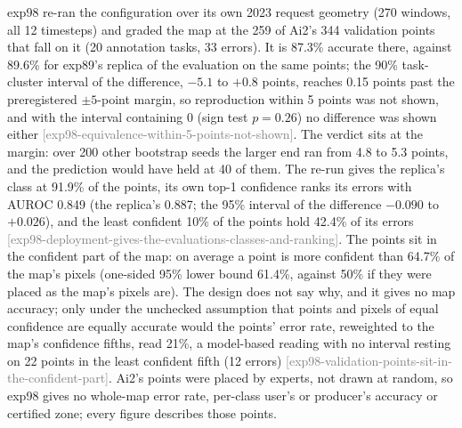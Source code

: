 \documentclass[11pt,a4paper]{article}
\newcommand{\claim}[1]{{\scriptsize\textsf{\textcolor{gray}{[#1]}}}}
\begin{document}
exp98 re-ran the configuration over its own 2023 request geometry (270 windows, all 12 timesteps) and graded the map
at the 259 of Ai2's 344 validation points that fall on it (20 annotation tasks, 33 errors). It is 87.3\% accurate
there, against 89.6\% for exp89's replica of the evaluation on the same points; the 90\% task-cluster interval of the
difference, $-5.1$ to $+0.8$ points, reaches 0.15 points past the preregistered $\pm5$-point margin, so reproduction
within 5 points was not shown, and with the interval containing 0 (sign test $p = 0.26$) no difference was shown
either \claim{exp98-equivalence-within-5-points-not-shown}. The verdict sits at the margin: over 200 other bootstrap
seeds the larger end ran from 4.8 to 5.3 points, and the prediction would have held at 40 of them. The re-run gives the
replica's class at 91.9\% of the points, its own top-1 confidence ranks its errors with AUROC 0.849 (the replica's
0.887; the 95\% interval of the difference $-0.090$ to $+0.026$), and the least confident 10\% of the points hold
42.4\% of its errors \claim{exp98-deployment-gives-the-evaluations-classes-and-ranking}. The points sit in the
confident part of the map: on average a point is more confident than 64.7\% of the map's pixels (one-sided 95\% lower
bound 61.4\%, against 50\% if they were placed as the map's pixels are). The design does not say why, and it gives no
map accuracy; only under the unchecked assumption that points and pixels of equal confidence are equally accurate
would the points' error rate, reweighted to the map's confidence fifths, read 21\%, a model-based reading with no
interval resting on 22 points in the least confident fifth (12 errors)
\claim{exp98-validation-points-sit-in-the-confident-part}. Ai2's points were placed by
experts, not drawn at random, so exp98 gives no whole-map error rate, per-class user's or producer's accuracy or
certified zone; every figure describes those points.
\end{document}
